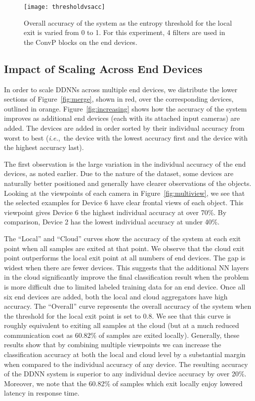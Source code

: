 \documentclass[10pt, conference, compsocconf]{IEEEtran}
\newcommand{\ie}{\emph{i.e.}}
\begin{document}
\begin{figure}
    \centering
    \texttt{[image: thresholdvsacc]}
    \caption{Overall accuracy of the system as the entropy threshold for the local exit is varied from 0 to 1. For this experiment, 4 filters are used in the ConvP blocks on the end devices.}
    \label{fig:thresholdvsacc}
\end{figure}



\subsection{Impact of Scaling Across End Devices}
\label{sec:scale-device}
In order to scale DDNNs across multiple end devices, we distribute the lower sections of Figure~\ref{fig:merge}, shown in red, over the corresponding devices, outlined in orange. Figure~\ref{fig:increasing} shows how the accuracy of the system improves as additional end devices (each with its attached input cameras) are added. The devices are added in order sorted by their individual accuracy from worst to best (\ie,~the device with the lowest accuracy first and the device with the highest accuracy last).

The first observation is the large variation in the individual accuracy of the end devices, as noted earlier. Due to the nature of the dataset, some devices are naturally better positioned and generally have clearer observations of the objects. Looking at the viewpoints of each camera in Figure~\ref{fig:multiview}, we see that the selected examples for Device 6 have clear frontal views of each object. This viewpoint gives Device 6 the highest individual accuracy at over 70\%. By comparison, Device 2 has the lowest individual accuracy at under 40\%. 

The ``Local'' and ``Cloud'' curves show the accuracy of the system at each exit point when all samples are exited at that point. We observe that the cloud exit point outperforms the local exit point at all numbers of end devices. The gap is widest when there are fewer devices. This suggests that the additional NN layers in the cloud significantly improve the final classification result when the problem is more difficult due to limited labeled training data for an end device. Once all six end devices are added, both the local and cloud aggregators have high accuracy. The ``Overall'' curve represents the overall accuracy of the system when the threshold for the local exit point is set to $0.8$. We see that this curve is roughly equivalent to exiting all samples at the cloud (but at a much reduced communication cost as 60.82\% of samples are exited locally). Generally, these results show that by combining multiple viewpoints we can increase the classification accuracy at both the local and cloud level by a substantial margin when compared to the individual accuracy of any device. The resulting accuracy of the DDNN system is superior to any individual device accuracy by over 20\%. Moreover, we note that the 60.82\% of samples which exit locally enjoy lowered latency in response time.
\end{document}
